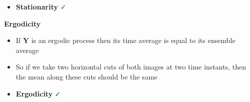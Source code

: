 \documentclass[UKenglish,8pt,aspectratio=1610]{beamer}
\begin{document}
\begin{frame}
\begin{columns}
\begin{column}{0.5\textwidth}
\begin{itemize}
	\item \textbf{Stationarity} \textcolor{green}{\faCheck}
\end{itemize}
\textbf{Ergodicity}
\begin{itemize}
	\item If $\mathbf{Y}$ is an ergodic process then its time average is equal to its ensemble average
	\item So if we take two horizontal cuts of both images at two time instants, then the mean along these cuts should be the same
	\item \textbf{Ergodicity} \textcolor{green}{\faCheck}
\end{itemize}
\end{column}
\end{columns}

\end{frame}
\end{document}
